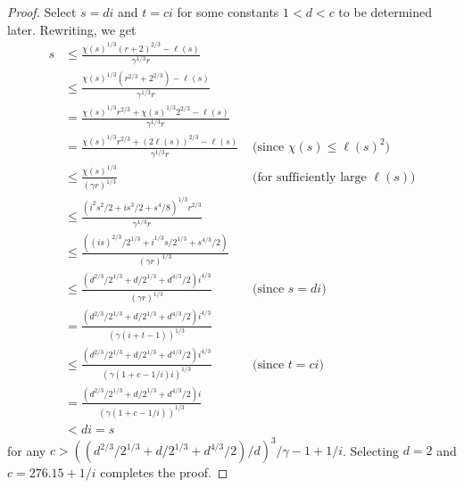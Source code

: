 \documentclass[12pt]{article}
\begin{document}
\begin{proof}
Select $s=di$ and $t=ci$ for some constants $1 < d < c$ to be determined
later.
Rewriting, we get
\[
  \begin{aligned}
  s 
   &\le \frac{\chi(s)^{1/3} (r+2)^{2/3} - \ell(s)}{\gamma^{1/3}r} \\ 
   &\le \frac{\chi(s)^{1/3} (r^{2/3}+2^{2/3}) - \ell(s)}{\gamma^{1/3} r} \\
   & = \frac{\chi(s)^{1/3}r^{2/3}+\chi(s)^{1/3}2^{2/3} - \ell(s)}{\gamma^{1/3} r}  \\
   & = \frac{\chi(s)^{1/3}r^{2/3}+(2\ell(s))^{2/3} - \ell(s)}{\gamma^{1/3} r} 
    & \mbox{ (since $\chi(s) \le \ell(s)^2$)} \\
   &\le \frac{\chi(s)^{1/3}}{(\gamma r)^{1/3}}
    & \mbox{ (for sufficiently large $\ell(s)$)} \\
   &\le \frac{(i^2s^2/2 + is^3/2 + s^4/8)^{1/3}r^{2/3}}{\gamma^{1/3} r}  \\
   &\le \frac{((is)^{2/3}/2^{1/3} + i^{1/3}s/2^{1/3} + s^{4/3}/2)}{(\gamma r)^{1/3}}  \\
   &\le \frac{(d^{2/3}/2^{1/3}+d/2^{1/3}+d^{4/3}/2)i^{4/3}}{(\gamma r)^{1/3}}  
    & \mbox{ (since $s=di$)} \\
   & =  \frac{(d^{2/3}/2^{1/3}+d/2^{1/3}+d^{4/3}/2)i^{4/3}}{(\gamma(i+t-1))^{1/3}} \\ 
   &\le  \frac{(d^{2/3}/2^{1/3}+d/2^{1/3}+d^{4/3}/2)i^{4/3}}{(\gamma(1+c-1/i)i)^{1/3}}  
    & \mbox{ (since $t=ci$)} \\
   & =  \frac{(d^{2/3}/2^{1/3}+d/2^{1/3}+d^{4/3}/2)i}{(\gamma(1+c-1/i))^{1/3}} \\ 
   & < di = s
  \end{aligned}
\]
for any $c > ((d^{2/3}/2^{1/3}+d/2^{1/3}+d^{4/3}/2)/d)^3/\gamma-1+1/i$.
Selecting $d=2$ and $c=276.15+1/i$ completes the proof.
\end{proof}
\end{document}
